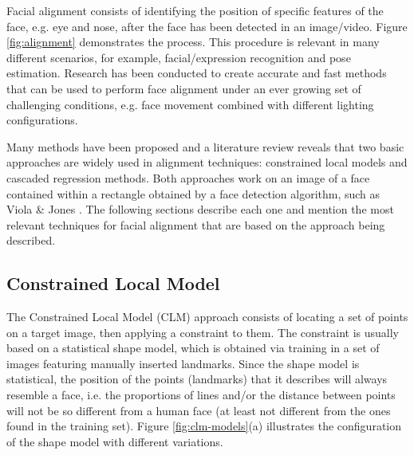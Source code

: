 Facial alignment consists of identifying the position of specific features of the face, e.g. eye and nose, after the face has been detected in an image/video. Figure \ref{fig:alignment} demonstrates the process. This procedure is relevant in many different scenarios, for example, facial/expression recognition and pose estimation. Research has been conducted to create accurate and fast methods that can be used to perform face alignment under an ever growing set of challenging conditions, e.g. face movement combined with different lighting configurations.

Many methods have been proposed and a literature review reveals that two basic approaches are widely used in alignment techniques: constrained local models and cascaded regression methods. Both approaches work on an image of a face contained within a rectangle obtained by a face detection algorithm, such as Viola \& Jones \parencite{viola2004robust}. The following sections describe each one and mention the most relevant techniques for facial alignment that are based on the approach being described.

\subsection{Constrained Local Model}

The Constrained Local Model (CLM) approach consists of locating a set of points on a target image, then applying a constraint to them. The constraint is usually based on a statistical shape model, which is obtained via training in a set of images featuring manually inserted landmarks. Since the shape model is statistical, the position of the points (landmarks) that it describes will always resemble a face, i.e. the proportions of lines and/or the distance between points will not be so different from a human face (at least not different from the ones found in the training set). Figure \ref{fig:clm-models}(a) illustrates the configuration of the shape model with different variations.


